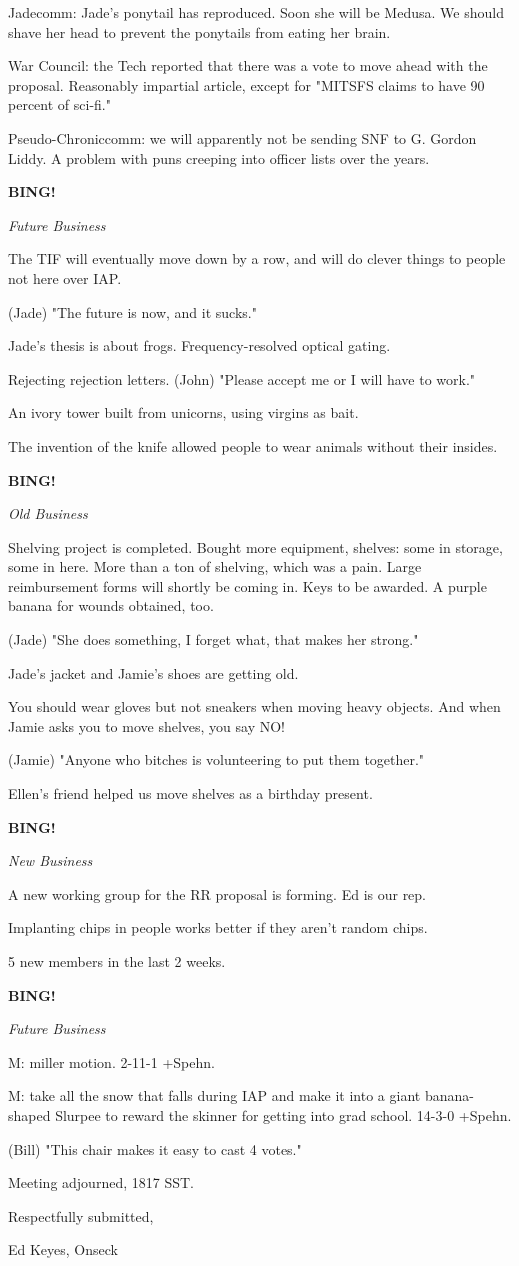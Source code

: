 \documentclass[12pt]{article}
\newcommand{\bing}{{\bf BING!} }
\newcommand{\goto}[1]{\bing \vskip 12pt \centerline{{\em{#1}}}}
\begin{document}
Jadecomm: Jade's ponytail has reproduced. Soon she will be Medusa. We should shave her head to prevent the ponytails from eating her brain.

War Council: the Tech reported that there was a vote to move ahead with the proposal. Reasonably impartial article, except for "MITSFS claims to have 90 percent of sci-fi."

Pseudo-Chroniccomm: we will apparently not be sending SNF to G. Gordon Liddy. A problem with puns creeping into officer lists over the years.

\goto{Future Business}

The TIF will eventually move down by a row, and will do clever things to people not here over IAP.

(Jade) "The future is now, and it sucks."

Jade's thesis is about frogs. Frequency-resolved optical gating.

Rejecting rejection letters. (John) "Please accept me or I will have to work."

An ivory tower built from unicorns, using virgins as bait.

The invention of the knife allowed people to wear animals without their insides.

\goto{Old Business}

Shelving project is completed. Bought more equipment, shelves: some in storage, some in here. More than a ton of shelving, which was a pain. Large reimbursement forms will shortly be coming in. Keys to be awarded. A purple banana for wounds obtained, too.

(Jade) "She does something, I forget what, that makes her strong."

Jade's jacket and Jamie's shoes are getting old.

You should wear gloves but not sneakers when moving heavy objects. And when Jamie asks you to move shelves, you say NO!

(Jamie) "Anyone who bitches is volunteering to put them together."

Ellen's friend helped us move shelves as a birthday present.

\goto{New Business}

A new working group for the RR proposal is forming. Ed is our rep.

Implanting chips in people works better if they aren't random chips.

5 new members in the last 2 weeks.

\goto{Future Business}

M: miller motion. 2-11-1 +Spehn.

M: take all the snow that falls during IAP and make it into a giant banana-shaped Slurpee to reward the skinner for getting into grad school. 14-3-0 +Spehn.

(Bill) "This chair makes it easy to cast 4 votes."

\vspace{12pt}

\noindent
Meeting adjourned, 1817 SST.

\vspace{18pt}

\centerline{Respectfully submitted,}
\centerline{Ed Keyes, Onseck}
\end{document}
